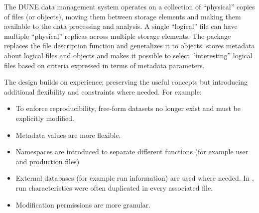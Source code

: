 \documentclass[../main-v1.tex]{subfiles}
\begin{document}
 
The DUNE data  management system operates on a collection of ``physical'' copies of files (or objects), moving them between storage elements and making them available to the data processing and analysis. 
A single  ``logical'' file can have multiple ``physical'' replicas across multiple storage elements. The  package replaces the  file description function and generalizes it to objects.  
 stores metadata about logical files and objects and makes it possible to select ``interesting'' logical files based on criteria expressed in terms of metadata parameters. 

The  design builds on  experience; preserving the useful concepts but introducing additional flexibility and constraints where needed.   For example:

\begin{itemize}  
\item To enforce reproducibility, free-form datasets no longer exist and must be explicitly modified. 
\item Metadata values are more flexible.
\item Namespaces are introduced to separate different functions (for example user and production files)
\item External databases (for example run information) are used where needed.  In , run characteristics were often duplicated in every associated file.
\item Modification permissions are more granular.
\end{itemize} 
\end{document}
